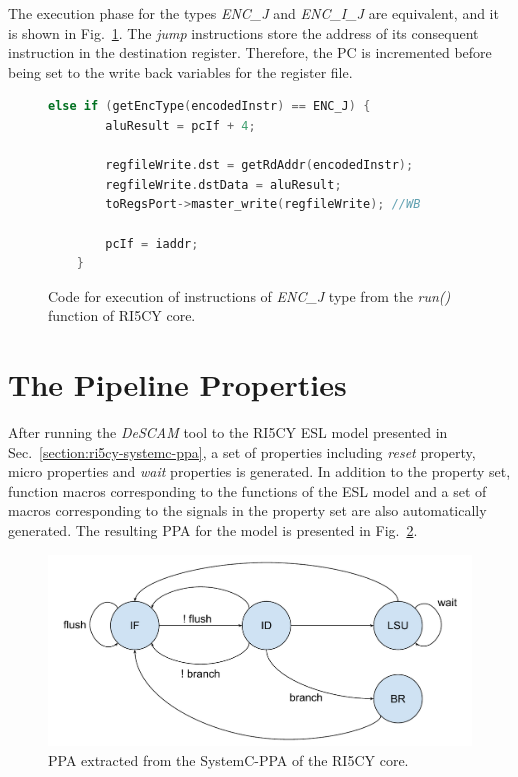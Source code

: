 The execution phase for the types \textit{ENC\_J} and \textit{ENC\_I\_J} are equivalent, and it is shown in Fig.~\ref{fig:ri5cy-enc-j}. The \textit{jump} instructions store the address of its consequent instruction in the destination register. Therefore, the PC is incremented before being set to the write back variables for the register file.

\begin{figure}[htb!]
    \begin{lstlisting}[language=c++]
    else if (getEncType(encodedInstr) == ENC_J) {
        aluResult = pcIf + 4;
        
        regfileWrite.dst = getRdAddr(encodedInstr);
        regfileWrite.dstData = aluResult;
        toRegsPort->master_write(regfileWrite); //WB
        
        pcIf = iaddr;
    }\end{lstlisting}
    \caption{Code for execution of instructions of \textit{ENC\_J} type from the \textit{run()} function of RI5CY core.}
    \label{fig:ri5cy-enc-j}
\end{figure}

\section{The Pipeline Properties}
\label{section:ri5cy_pipe_ppt}

After running the \textit{DeSCAM} tool to the RI5CY ESL model presented in Sec.~\ref{section:ri5cy-systemc-ppa}, a set of properties including \textit{reset} property, micro properties and \textit{wait} properties is generated. In addition to the property set, function macros corresponding to the functions of the ESL model and a set of macros corresponding to the signals in the property set are also automatically generated. The resulting PPA for the model is presented in Fig.~\ref{fig:ri5cy-ppa}.

\begin{figure}[htb!]
	\centering
	\includegraphics[width=\textwidth]{images/ri5cy-ppa.pdf}
	\caption{PPA extracted from the SystemC-PPA of the RI5CY core.}
	\label{fig:ri5cy-ppa}
\end{figure}

